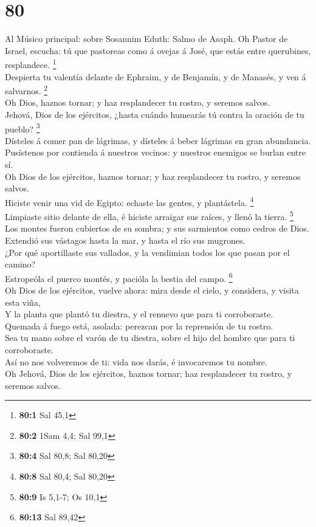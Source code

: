 \hypertarget{section-79}{%
\section{80}\label{section-79}}

 Al Músico principal: sobre Sosannim Eduth: Salmo de Asaph.
Oh Pastor de Israel, escucha: tú que pastoreas como á ovejas á José, que
estás entre querubines, resplandece. \footnote{\textbf{80:1} Sal 45,1}\\
 Despierta tu valentía delante de Ephraim, y de Benjamín, y
de Manasés, y ven á salvarnos. \footnote{\textbf{80:2} 1Sam 4,4; Sal
  99,1}\\
 Oh Dios, haznos tornar; y haz resplandecer tu rostro, y
seremos salvos.\\
 Jehová, Dios de los ejércitos, ¿hasta cuándo humearás tú
contra la oración de tu pueblo? \footnote{\textbf{80:4} Sal 80,8; Sal
  80,20}\\
 Dísteles á comer pan de lágrimas, y dísteles á beber
lágrimas en gran abundancia.\\
 Pusístenos por contienda á nuestros vecinos: y nuestros
enemigos se burlan entre sí.\\
 Oh Dios de los ejércitos, haznos tornar; y haz resplandecer
tu rostro, y seremos salvos.\\
 Hiciste venir una vid de Egipto: echaste las gentes, y
plantástela. \footnote{\textbf{80:8} Sal 80,4; Sal 80,20}\\
 Limpiaste sitio delante de ella, é hiciste arraigar sus
raíces, y llenó la tierra. \footnote{\textbf{80:9} Is 5,1-7; Os 10,1}\\
 Los montes fueron cubiertos de su sombra; y sus sarmientos
como cedros de Dios.\\
 Extendió sus vástagos hasta la mar, y hasta el río sus
mugrones.\\
 ¿Por qué aportillaste sus vallados, y la vendimian todos
los que pasan por el camino?\\
 Estropeóla el puerco montés, y pacióla la bestia del
campo. \footnote{\textbf{80:13} Sal 89,42}\\
 Oh Dios de los ejércitos, vuelve ahora: mira desde el
cielo, y considera, y visita esta viña,\\
 Y la planta que plantó tu diestra, y el renuevo que para
ti corroboraste.\\
 Quemada á fuego está, asolada: perezcan por la reprensión
de tu rostro.\\
 Sea tu mano sobre el varón de tu diestra, sobre el hijo
del hombre que para ti corroboraste.\\
 Así no nos volveremos de ti: vida nos darás, é invocaremos
tu nombre.\\
 Oh Jehová, Dios de los ejércitos, haznos tornar; haz
resplandecer tu rostro, y seremos salvos.

